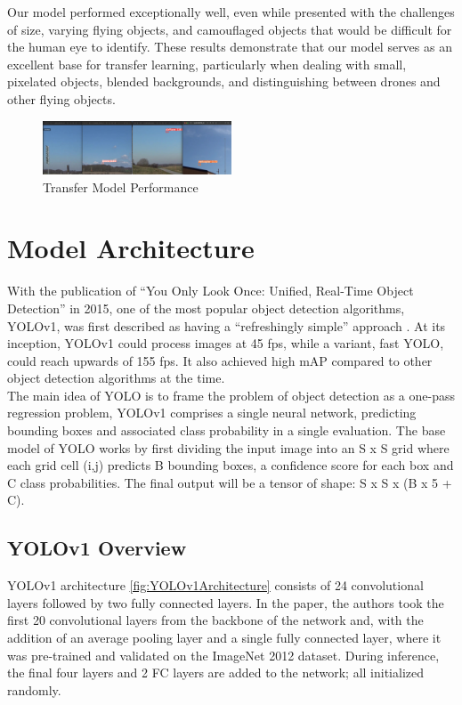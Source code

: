\documentclass[10pt,twocolumn,letterpaper]{article}
\begin{document}
Our model performed exceptionally well, even while presented with the challenges of size, varying flying objects, and camouflaged objects that would be difficult for the human eye to identify. These results demonstrate that our model serves as an excellent base for transfer learning, particularly when dealing with small, pixelated objects, blended backgrounds, and distinguishing between drones and other flying objects.

\begin{figure}[h]
    \centering
    \includegraphics[width=0.5\textwidth]{figures/transfer_model.png}
    \caption{Transfer Model Performance \cite{TransferDataset}}
    \label{fig:Transfer Model Performance}
\end{figure}


\section{Model Architecture}
With the publication of “You Only Look Once: Unified, Real-Time Object Detection” \cite{YOLO_OG} in 2015, one of the most popular object detection algorithms, YOLOv1, was first described as having a “refreshingly simple” approach \cite{CompReview}. At its inception, YOLOv1 could process images at 45 fps, while a variant, fast YOLO, could reach upwards of 155 fps. It also achieved high mAP compared to other object detection algorithms at the time.\\
\indent The main idea of YOLO is to frame the problem of object detection as a one-pass regression problem, YOLOv1 comprises a single neural network, predicting bounding boxes and associated class probability in a single evaluation. The base model of YOLO works by first dividing the input image into an S x S grid where each grid cell (i,j) predicts B bounding boxes, a confidence score for each box and C class probabilities. The final output will be a tensor of shape: S x S x (B x 5 + C).

\subsection{YOLOv1 Overview}
YOLOv1 architecture \ref{fig:YOLOv1Architecture} consists of 24 convolutional layers followed by two fully connected layers. In the paper, the authors took the first 20 convolutional layers from the backbone of the network and, with the addition of an average pooling layer and a single fully connected layer, where it was pre-trained and validated on the ImageNet 2012 dataset. During inference, the final four layers and 2 FC layers are added to the network; all initialized randomly.
\end{document}
